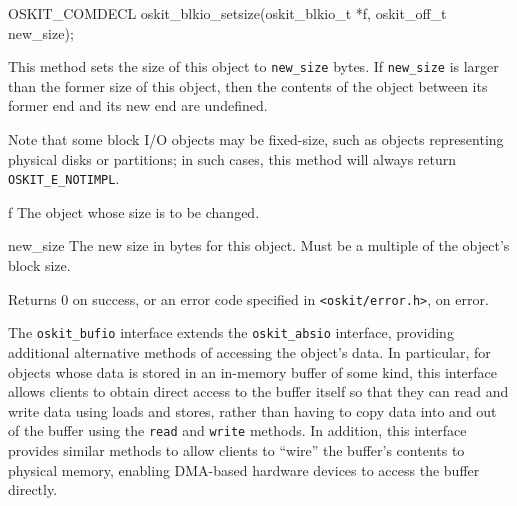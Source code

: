 \begin{apisyn}

	\funcproto OSKIT_COMDECL
	oskit_blkio_setsize(oskit_blkio_t *f, 
			   oskit_off_t new_size);
\end{apisyn}
\begin{apidesc}
	This method sets the size of this object to
	{\tt new_size} bytes.  If {\tt new_size}
	is larger than the former size of this object,
	then the contents of the object between its
	former end and its new end are undefined.

	Note that some block I/O objects may be fixed-size,
	such as objects representing physical disks or partitions;
	in such cases,
	this method will always return \texttt{OSKIT_E_NOTIMPL}.
\end{apidesc}
\begin{apiparm}
	\item[f]
		The object whose size is to be changed.
	\item[new_size]
		The new size in bytes for this object.
		Must be a multiple of the object's block size.
\end{apiparm}
\begin{apiret}
	Returns 0 on success, or an error code specified in
	{\tt <oskit/error.h>}, on error.
\end{apiret}


\label{oskit-bufio}

The \texttt{oskit_bufio} interface extends the \texttt{oskit_absio} interface,
providing additional alternative methods of accessing the object's data.
In particular,
for objects whose data is stored in an in-memory buffer of some kind,
this interface allows clients to obtain direct access to the buffer itself
so that they can read and write data using
loads and stores,
rather than having to copy data into and out of the buffer
using the \texttt{read} and \texttt{write} methods.
In addition, this interface provides similar methods
to allow clients to ``wire'' the buffer's contents to physical memory,
enabling DMA-based hardware devices to access the buffer directly.

